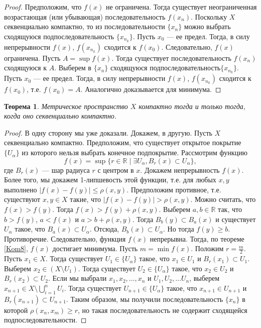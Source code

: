 \documentclass[12pt, titlepage, oneside]{amsbook}
\newcommand{\RR}{\mathbb{R}}
\newtheorem{theorem}{Теорема}[chapter]
\theoremstyle{definition}
\theoremstyle{remark}
\begin{document}
\begin{proof}
	Предположим, что $f(x)$ не ограничена. Тогда существует неограниченная возрастающая (или убывающая) последовательность $f(x_n)$. Поскольку $X$ секвенциально компактно, то из последовательности $\{x_n\}$ можно выбрать сходящуюся подпоследовательность $\{x_{n_k}\}$. Пусть $x_0$ --- ее предел. Тогда, в силу непрерывности $f(x)$, $f(x_{n_k})$ сходится к $f(x_0)$. Следовательно, $f(x)$ ограничена. Пусть $A=\sup f(x)$. Тогда существует последовательность $f(x_n)$ сходящуюся к $A$. Выберем в $\{x_n\}$ сходящуюся подпоследовательность$\{x_{n_k}\}$. Пусть $x_0$ --- ее предел. Тогда, в силу непрерывности $f(x)$, $f(x_{n_k})$ сходится к $f(x_0)$, т.е. $f(x_0)=A$. Аналогично доказывается для минимума.
\end{proof}

\begin{theorem}
	\label{Kom9}
	Метрическое пространство $X$ компактно тогда и только тогда, когда оно секвенциально компактно.
\end{theorem}

\begin{proof}
	В одну сторону мы уже доказали. Докажем, в другую. Пусть $X$ секвенциально компактно. Предположим, что существует открытое покрытие $\{U_{\alpha}\}$ из которого нельзя выбрать конечное подпокрытие. Рассмотрим функцию $$f(x)=\sup\{r\in\RR\mid\exists U_{\alpha},  B_r(x)\subset U_{\alpha}\},$$ где $B_r(x)$ --- шар радиуса $r$ с центром в $x$. Докажем непрерывность $f(x)$. Более того, мы докажем 1-липшевость этой функции, т.е. для любых $x,y$ выполнено $|f(x)-f(y)|\leq\rho(x,y)$. Предположим противное, т.е. существуют $x,y\in X$ такие, что $|f(x)-f(y)|>\rho(x,y)$. Можно считать, что $f(x)>f(y)$. Тогда $f(x)>f(y)+\rho(x,y)$. Выберем $a,b\in\RR$ так, что $b>f(y)$, $a<f(x)$ и $a>b+\rho(x,y)$. Тогда $B_b(y)\subset B_a(x)$ и существует $U_{\alpha}$  такое, что $B_a(x)\subset U_{\alpha}$. Отсюда, $B_b(x)\subset U_{\alpha}$. Но тогда $f(y)\geq b$. Противоречие. Следовательно, функция $f(x)$ непрерывна. Тогда, по теореме \ref{Kom8}, $f(x)$ достигает минимума. Пусть $m=\min f(x)$. Положим $r=\frac{m}{2}$. Пусть $x_1\in X$. Тогда существует $U_1\in\{U_{\alpha}\}$ такое, что $x_1\in U_1$ и $B_r(x_1)\subset U_1$. Выберем $x_2\in(X\setminus U_1)$. Тогда существует $U_2\in\{U_{\alpha}\}$ такое, что $x_2\in U_2$ и $B_r(x_2)\subset U_2$. Если мы выбрали $x_1,x_2,\ldots,x_n$ и $U_1,U_2,\ldots U_n$, выберем $x_{n+1}\in X\setminus\bigcup\limits_{i=1}^n U_i$. Тогда существует $U_{n+1}\in\{U_{\alpha}\}$ такое, что $x_{n+1}\in U_{n+1}$ и $B_r(x_{n+1})\subset U_{n+1}$. Таким образом, мы получили последовательность $\{x_n\}$ в которой $\rho(x_n,x_m)\geq r$, но такая последовательность не содержит сходящейся подпоследовательности.
\end{proof}
\end{document}
